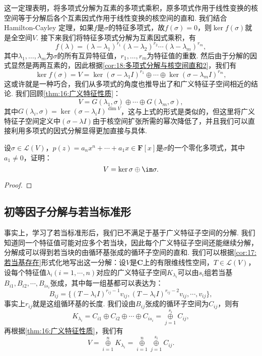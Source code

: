 这一定理表明，将多项式分解为互素的多项式乘积，原多项式作用于线性变换的核空间等于分解后各个互素因式作用于线性变换的核空间的直和. 我们结合 Hamilton-Cayley 定理，如果$f$是$\sigma$的特征多项式，故$f(\sigma)=0$，则$\ker f(\sigma)$就是全空间$V$. 接下来我们将特征多项式分解为互素因式乘积，有
\[f(\lambda)=(\lambda-\lambda_1)^{r_1}(\lambda-\lambda_2)^{r_2}\cdots(\lambda-\lambda_m)^{r_m},\]
其中$\lambda_1,\ldots,\lambda_m$为$\sigma$的所有互异特征值，$r_1,\ldots,r_m$为特征值的重数. 然后由于分解的因式显然是两两互素的，因此根据\autoref{cor:18:多项式分解与核空间直和2}，我们有
\[\ker f(\sigma)=V=\ker (\sigma-\lambda_1I)^{r_1}\oplus\cdots\oplus\ker (\sigma-\lambda_mI)^{r_m},\]
这或许就是一种巧合，我们从多项式的角度也推导出了和广义特征子空间相近的结论. 我们回顾\autoref{thm:16:广义特征性质}：
\[V=G(\lambda_1,\sigma)\oplus\cdots\oplus G(\lambda_m,\sigma),\]
其中$G(\lambda_i,\sigma)=\ker (\sigma-\lambda_iI)^{\dim V}$，这与上式的形式是类似的，但这里将广义特征子空间定义中$(\sigma-\lambda I)$由于核空间扩张所需的幂次降低了，并且我们可以直接利用多项式的因式分解显得更加直接与具体.
\begin{example}
    设$\sigma\in \mathcal{L}(V)$，$p(z)=a_nx^n+\cdots+a_1x\in\mathbf{F}[x]$是$\sigma$的一个零化多项式，其中$a_1\neq 0$，证明：
    \[V=\ker \sigma\oplus\im\sigma.\]
\end{example}

\begin{proof}

\end{proof}

\subsection{初等因子分解与若当标准形}
事实上，学习了若当标准形后，我们已不满足于基于广义特征子空间的分解. 我们知道同一个特征值可能对应多个若当块，因此每个广义特征子空间还能继续分解，分解成可以得到若当块的由循环基张成的循环子空间的直和. 我们可以根据\autoref{cor:17:若当基存在}形式化地写出这一分解：设$V$是$\mathbf{C}$上的有限维线性空间，$T\in\mathcal{L}(V)$，设每个特征值$\lambda_i(i=1,\cdots,n)$对应的广义特征子空间$K_{\lambda_i}$可以由$s_i$组若当基$B_{i1},B_{i2},\cdots,B_{is_i}$张成，其中每一组基都可以表达为：
\[B_{ij}=\{(T-\lambda_iI)^{r_{ij}-1}v_{ij},(T-\lambda_iI)^{r_{ij}-2}v_{ij},\cdots,v_{ij}\},\]
事实上$r_{ij}$就是这组循环基的长度. 我们设由$B_{ij}$张成的循环子空间为$C_{ij}$，则有
\[K_{\lambda_i}=C_{i1}\oplus C_{i2}\oplus\cdots\oplus C_{is_i}=\mathop{\oplus}\limits_{j=1}^{s_i} C_{ij},\]
再根据\autoref{thm:16:广义特征性质}，我们有
\begin{equation} \label{eq:19:循环子空间分解}
    V=\mathop{\oplus}\limits_{i=1}^n K_{\lambda_i}=\mathop{\oplus}\limits_{i=1}^n\mathop{\oplus}\limits_{j=1}^{s_i} C_{ij}.
\end{equation}

